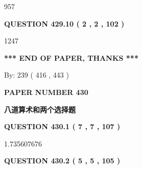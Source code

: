 \documentclass{ctexart}
\begin{document}
  
 
 
\noindent{}

957
 
 
  
\vspace{0.2in}
  
{\textbf{\Large{QUESTION
429.10 
 ( 2 , 2 , 102 )
}}}
  
  
 
 
\noindent{}

1247
 
 
   
   
 \vspace{0.2in}
 
   
   
   
   
\vspace{1.0in} 
{\textbf{\large{ *** END OF PAPER, THANKS *** }}} 
   
   
\hspace{1.0in} By: 
 239 ( 416 ,  443 )
   
   
   
   
\newpage 
\setcounter{page}{ 
   430001 } 
   
   
   
   
 {\textbf{ \Large{ PAPER NUMBER  430  }}}
   
   
\vspace{0.2in}
   
   
   
   
   
   
 \vspace{0.2in}
{\LARGE {\textbf{ 八道算术和两个选择题}}}
   
   
  
\vspace{0.2in}
  
{\textbf{\Large{QUESTION
430.1 
 ( 7 , 7 , 107 )
}}}
  
  
 
 
\noindent{}

1.735607676
 
 
  
\vspace{0.2in}
  
{\textbf{\Large{QUESTION
430.2 
 ( 5 , 5 , 105 )
}}}
  
\end{document}
